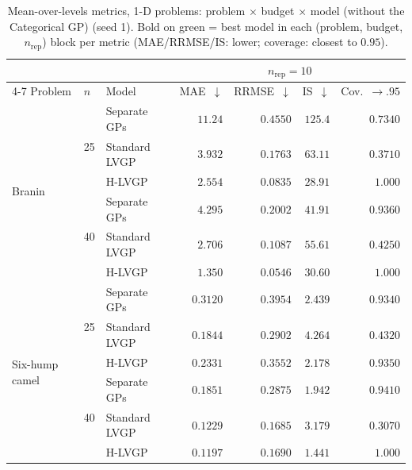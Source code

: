 \begin{table}[htbp]
\centering
\small
\setlength{\tabcolsep}{3.5pt}
\setlength{\fboxsep}{1.5pt}
\caption{Mean-over-levels metrics, 1-D problems: problem $\times$ budget $\times$ model (without the Categorical GP) (seed 1). Bold on green = best model in each (problem, budget, $n_{\mathrm{rep}}$) block per metric (MAE/RRMSE/IS: lower; coverage: closest to $0.95$).}
\label{tab:summary_nocat}
\begin{tabular}{lllrrrr}
\toprule
 & & & \multicolumn{4}{c}{$n_{\mathrm{rep}}=10$} \\
\cmidrule(lr){4-7}
Problem & $n$ & Model & MAE~$\downarrow$ & RRMSE~$\downarrow$ & IS~$\downarrow$ & Cov.~$\to.95$ \\
\midrule
\multirow{6}{*}{Branin} & \multirow{3}{*}{25} & Separate GPs & $11.24$ & $0.4550$ & $125.4$ & $0.7340$ \\
 &  & Standard LVGP & $3.932$ & $0.1763$ & $63.11$ & $0.3710$ \\
 &  & H-LVGP & \colorbox{green!20}{\boldmath$2.554$} & \colorbox{green!20}{\boldmath$0.0835$} & \colorbox{green!20}{\boldmath$28.91$} & \colorbox{green!20}{\boldmath$1.000$} \\
\cmidrule(lr){2-7}
 & \multirow{3}{*}{40} & Separate GPs & $4.295$ & $0.2002$ & $41.91$ & \colorbox{green!20}{\boldmath$0.9360$} \\
 &  & Standard LVGP & $2.706$ & $0.1087$ & $55.61$ & $0.4250$ \\
 &  & H-LVGP & \colorbox{green!20}{\boldmath$1.350$} & \colorbox{green!20}{\boldmath$0.0546$} & \colorbox{green!20}{\boldmath$30.60$} & $1.000$ \\
\midrule
\multirow{6}{*}{Six-hump camel} & \multirow{3}{*}{25} & Separate GPs & $0.3120$ & $0.3954$ & $2.439$ & $0.9340$ \\
 &  & Standard LVGP & \colorbox{green!20}{\boldmath$0.1844$} & \colorbox{green!20}{\boldmath$0.2902$} & $4.264$ & $0.4320$ \\
 &  & H-LVGP & $0.2331$ & $0.3552$ & \colorbox{green!20}{\boldmath$2.178$} & \colorbox{green!20}{\boldmath$0.9350$} \\
\cmidrule(lr){2-7}
 & \multirow{3}{*}{40} & Separate GPs & $0.1851$ & $0.2875$ & $1.942$ & \colorbox{green!20}{\boldmath$0.9410$} \\
 &  & Standard LVGP & $0.1229$ & \colorbox{green!20}{\boldmath$0.1685$} & $3.179$ & $0.3070$ \\
 &  & H-LVGP & \colorbox{green!20}{\boldmath$0.1197$} & $0.1690$ & \colorbox{green!20}{\boldmath$1.441$} & $1.000$ \\
\bottomrule
\end{tabular}
\end{table}
